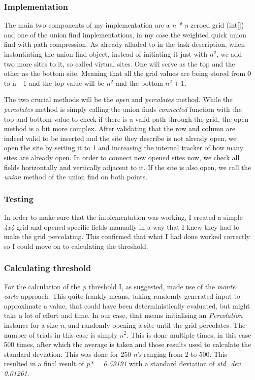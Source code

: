 \documentclass[12pt]{article}
\begin{document}
\subsubsection{Implementation}

The main two components of my implementation are a \emph{n * n} zeroed grid (int[]) and one of the
union find implementations, in my case the weighted quick union find with path compression.
As already alluded to in the task description, when instantiating the union find object, instead of initiating
it just with \emph{$n^2$}, we add two more sites to it, so called virtual sites. One will serve
as the top and the other as the bottom site. Meaning that all the grid values are being stored from
0 to n - 1 and the top value will be $n^2$ and the bottom $n^2 + 1$.

The two crucial methods will be the \emph{open} and \emph{percolates} method. While the \emph{percolates}
method is simply calling the union finds \emph{connected} function with the top and bottom value to check if
there is a valid path through the grid, the open method is a bit more complex. After validating that
the row and column are indeed valid to be inserted and the site they describe is not already open, we open the 
site by setting it to 1 and increasing the internal tracker of how many sites are already open.
In order to connect new opened sites now, we check all fields horizontally and vertically adjacent
to it. If the site is also open, we call the \emph{union} method of the union find on both points.

\subsubsection{Testing}

In order to make sure that the implementation was working, I created a simple \emph{4x4} grid
and opened specific fields manually in a way that I knew they had to make the grid percolating.
This confirmed that what I had done worked correctly so I could move on to calculating the threshold.

\subsubsection{Calculating threshold}

For the calculation of the \emph{p} threshold I, as suggested, made use of the \emph{monte carlo}
approach. This quite frankly means, taking randomly generated input to approximate a value, that could have been
deterministically evaluated, but might take a lot of effort and time. In our case, that means
initialising an \emph{Percolation} instance for a size \emph{n}, and randomly opening a site
until the grid percolates. The number of trials in this case is simply \emph{$n^2$}. This is done multiple times,
in this case 500 times, after which the average is taken and those results used to calculate the 
standard deviation. This was done for 250 \emph{n's} ranging from 2 to 500. This resulted in a
final result of \emph{p* = 0.59191} with a standard deviation of \emph{std\_dev = 0.01261}.
\end{document}

